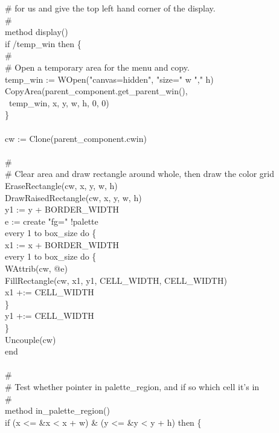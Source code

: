 {\>\# for us and give the top left hand corner of the display.  \\
\>\# \\
\>method display() \\
\>\>if /temp\_win then \{ \\
\>\>\>\# \\
\>\>\>\# Open a temporary area for the menu and copy. \\
\>\>\>temp\_win := WOpen("canvas=hidden", "size=" {\textbar}{\textbar} w
{\textbar}{\textbar} "," {\textbar}{\textbar} h) \\
\>\>\>CopyArea(parent\_component.get\_parent\_win(), \\
\>\>\>\>\>\>\ temp\_win, x, y, w, h, 0, 0) \\
\>\>\>\} \\
\ \\
\>\>cw := Clone(parent\_component.cwin) \\
\ \\
\>\>\# \\
\>\>\# Clear area and draw rectangle around whole, then draw the color grid \\
\>\>EraseRectangle(cw, x, y, w, h) \\
\>\>DrawRaisedRectangle(cw, x, y, w, h) \\
\>\>y1 := y + BORDER\_WIDTH \ \ \ \ \  \\
\>\>e := create "fg=" {\textbar}{\textbar} !palette \\
\>\>every 1 to box\_size do \{ \\
\>\>\>x1 := x + BORDER\_WIDTH \  \\
\>\>\>every 1 to box\_size do \{ \\
\>\>\>\>WAttrib(cw, @e) \\
\>\>\>\>FillRectangle(cw, x1, y1, CELL\_WIDTH, CELL\_WIDTH) \\
\>\>\>\>x1 +:= CELL\_WIDTH \\
\>\>\>\>\} \\
\>\>\>y1 +:= CELL\_WIDTH \\
\>\>\>\} \\
\>\>Uncouple(cw) \\
\>end \\
\ \\
\>\# \\
\>\# Test whether pointer in palette\_region, and if so which cell it's in \\
\>\# \\
\>method in\_palette\_region() \\
\>\>if (x {\textless}= \&x {\textless} x + w) \& (y {\textless}= \&y {\textless} y + h) then \{ \\
}

